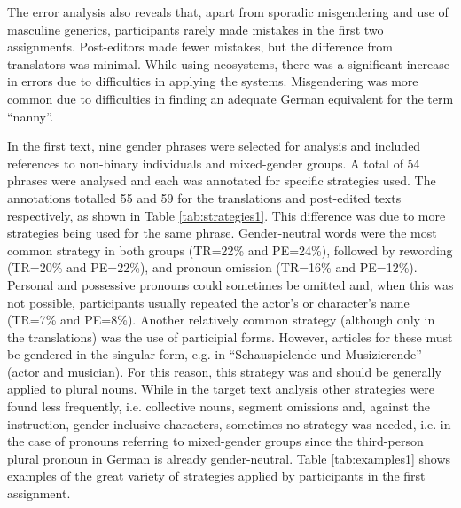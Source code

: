 The error analysis also reveals that, apart from sporadic misgendering and use of masculine generics, participants rarely made mistakes in the first two assignments. Post-editors made fewer mistakes, but the difference from translators was minimal.  While using neosystems, there was a significant increase in errors due to difficulties in applying the systems. Misgendering was more common due to difficulties in finding an adequate German equivalent for the term ``nanny''. 

In the first text, nine gender phrases were selected for analysis and included references to non-binary individuals and mixed-gender groups. A total of 54 phrases were analysed and each was annotated for specific strategies used. The annotations totalled 55 and 59 for the translations and post-edited texts respectively, as shown in Table \ref{tab:strategies1}. This difference was due to more strategies being used for the same phrase. Gender-neutral words were the most common strategy in both groups (TR=22\% and PE=24\%), followed by rewording (TR=20\% and PE=22\%), and pronoun omission (TR=16\% and PE=12\%). Personal and possessive pronouns could sometimes be omitted and, when this was not possible, participants usually repeated the actor's or character's name (TR=7\% and PE=8\%). Another relatively common strategy (although only in the translations) was the use of participial forms. However, articles for these must be gendered in the singular form, e.g. in ``Schauspielende und Musizierende'' (actor and musician). For this reason, this strategy was and should be generally applied to plural nouns. While in the target text analysis other strategies were found less frequently, i.e. collective nouns, segment omissions and, against the instruction, gender-inclusive characters, sometimes no strategy was needed, i.e. in the case of pronouns referring to mixed-gender groups since the third-person plural pronoun in German is already gender-neutral. Table \ref{tab:examples1} shows examples of the great variety of strategies applied by participants in the first assignment.  

